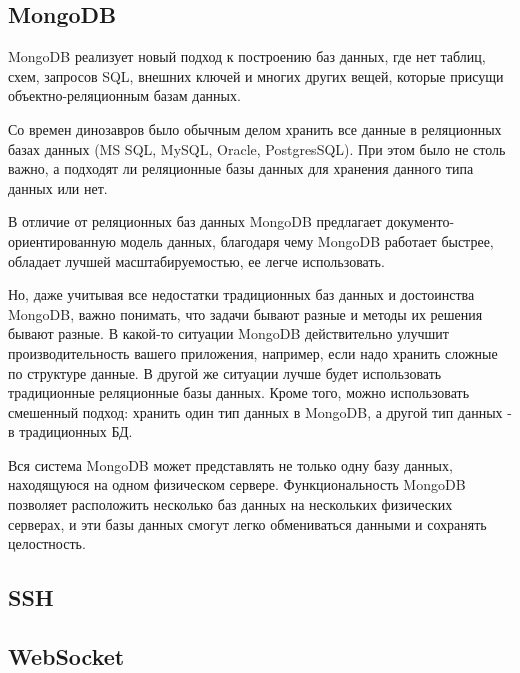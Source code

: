 \subsection{MongoDB}

MongoDB реализует новый подход к построению баз данных, где нет таблиц, схем, запросов SQL, внешних ключей и многих других вещей, которые присущи объектно-реляционным базам данных.

Со времен динозавров было обычным делом хранить все данные в реляционных базах данных (MS SQL, MySQL, Oracle, PostgresSQL). При этом было не столь важно, а подходят ли реляционные базы данных для хранения данного типа данных или нет.

В отличие от реляционных баз данных MongoDB предлагает документо-ориентированную модель данных, благодаря чему MongoDB работает быстрее, обладает лучшей масштабируемостью, ее легче использовать.

Но, даже учитывая все недостатки традиционных баз данных и достоинства MongoDB, важно понимать, что задачи бывают разные и методы их решения бывают разные. В какой-то ситуации MongoDB действительно улучшит производительность вашего приложения, например, если надо хранить сложные по структуре данные. В другой же ситуации лучше будет использовать традиционные реляционные базы данных. Кроме того, можно использовать смешенный подход: хранить один тип данных в MongoDB, а другой тип данных - в традиционных БД.

Вся система MongoDB может представлять не только одну базу данных, находящуюся на одном физическом сервере. Функциональность MongoDB позволяет расположить несколько баз данных на нескольких физических серверах, и эти базы данных смогут легко обмениваться данными и сохранять целостность.

\subsection{SSH}

\subsection{WebSocket}